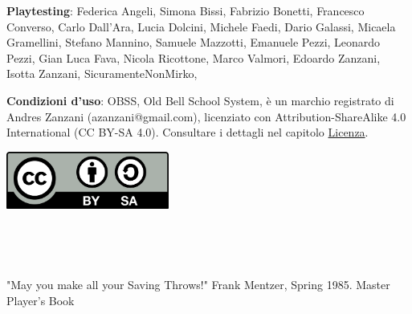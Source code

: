 \vfill

\begin{mdframed}[roundcorner=10pt]

\medskip

\thispagestyle{empty}

\textbf{Playtesting}: Federica Angeli, Simona Bissi, Fabrizio Bonetti, Francesco Converso, Carlo Dall'Ara, Lucia Dolcini, Michele Faedi, Dario Galassi, Micaela Gramellini, Stefano Mannino, Samuele Mazzotti, Emanuele Pezzi, Leonardo Pezzi, Gian Luca Fava, Nicola Ricottone, Marco Valmori, Edoardo Zanzani, Isotta Zanzani, SicuramenteNonMirko,

\bigskip

\begin{flushleft}\textbf{Condizioni d'uso}: OBSS, Old Bell School System, è un marchio registrato di Andres Zanzani (azanzani@gmail.com), licenziato con Attribution-ShareAlike 4.0 International (CC BY-SA 4.0). Consultare i dettagli nel capitolo \hyperlink{Licenza}{Licenza}.
\end{flushleft}

\vspace{0.5cm}

\begin{center}
\includegraphics[keepaspectratio,width=0.4\textwidth]{immagini/CC_BY-SA_icon.svg.png}
\end{center}

\medskip

\end{mdframed}


\pagebreak ~

\thispagestyle{empty}

\pagebreak ~

\setcounter{page}{1}


\setcounter{page}{1}

\begin{multicols}{2}


{\small \tableofcontents{}}

\end{multicols}

\vfill

\begin{changemargin}{0.3cm}{0.3cm}\begin{tcolorbox}
"May you make all your Saving Throws!" Frank Mentzer, Spring 1985. Master Player's Book
\end{tcolorbox}\end{changemargin}

